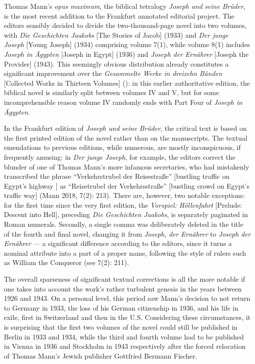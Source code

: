 \begin{review}
Thomas Mann's \emph{opus maximum}, the biblical tetralogy \emph{Joseph
und seine Brüder}, is the most recent addition to the Frankfurt
annotated editorial project. The editors sensibly decided to divide the
two-thousand-page novel into two volumes, with \emph{Die Geschichten
Jaakobs} {[}The Stories of Jacob{]} (1933) and \emph{Der junge
Joseph} {[}Young Joseph{]} (1934) comprising volume 7(1), while
volume 8(1) includes \emph{Joseph in Ägypten} {[}Joseph in
Egypt{]} (1936) and \emph{Joseph der Ernährer} {[}Joseph the
Provider{]} (1943). This seemingly obvious distribution already
constitutes a significant improvement over the \emph{Gesammelte Werke in
dreizehn Bänden} {[}Collected Works in Thirteen Volumes{]}
(\citeyear{mann_gesammelte_1974}): in this earlier authoritative edition, the biblical novel is
similarly split between volumes IV and V, but for some incomprehensible
reason volume IV randomly ends with Part Four of \emph{Joseph in
Ägypten}.

In the Frankfurt edition of \emph{Joseph und seine Brüder}, the critical
text is based on the first printed edition of the novel rather than on
the manuscripts. The textual emendations to previous editions, while
numerous, are mostly inconspicuous, if frequently amusing: in \emph{Der
junge Joseph}, for example, the editors correct the blunder of one of
Thomas Mann's more infamous secretaries, who had mistakenly transcribed
the phrase ``Verkehrstrubel der Reisestraße'' {[}bustling traffic on
Egypt's highway \citep[1055]{mann_joseph_2005}{]} as
``Reisetrubel der Verkehrsstraße'' {[}bustling crowd on Egypt's traffic
way{]} (Mann 2018, 7(2): 213). There are, however, two
notable exceptions: for the first time since the very first edition, the
\emph{Vorspiel: Höllenfahrt} {[}Prelude: Descent into Hell{]},
preceding \emph{Die Geschichten Jaakobs}, is separately paginated in
Roman numerals. Secondly, a single comma was deliberately deleted in the
title of the fourth and final novel, changing it from \emph{Joseph, der
Ernährer} to \emph{Joseph der Ernährer} --- a significant difference
according to the editors, since it turns a nominal attribute into a part
of a proper name, following the style of rulers such as William the
Conqueror (see 7(2): 211).

The overall sparseness of significant textual corrections is all the
more notable if one takes into account the work's rather turbulent
genesis in the years between 1926 and 1943. On a personal level, this
period saw Mann's decision to not return to Germany in 1933, the loss of
his German citizenship in 1936, and his life in exile, first in
Switzerland and then in the U.S. Considering these circumstances, it is
surprising that the first two volumes of the novel could still be
published in Berlin in 1933 and 1934, while the third and fourth volume
had to be published in Vienna in 1936 and Stockholm in 1943 respectively
after the forced relocation of Thomas Mann's Jewish publisher Gottfried
Bermann Fischer.


\end{review}
